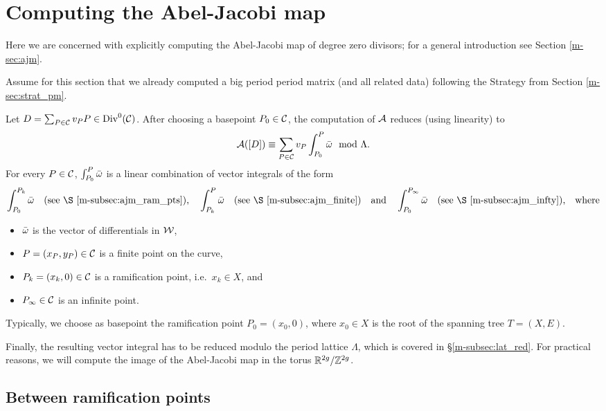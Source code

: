\documentclass[main.tex]{subfiles}
\begin{document}
  \section{Computing the Abel-Jacobi map}\label{sec:comp_ajm}
  
   Here we are concerned with explicitly computing the Abel-Jacobi map of degree zero divisors; for a general introduction see Section \ref{m-sec:ajm}.
   
   Assume for this section that we already computed a big period period matrix (and all related data) following the Strategy from Section \ref{m-sec:strat_pm}. 
   
   Let $D = \sum_{P \in \mathcal{C}} v_P P \in \operatorname{Div}^0(\mathcal{C})$. After choosing a basepoint $P_0 \in \mathcal{C}$, the computation of $\mathcal{A}$ reduces (using linearity) to
   \begin{equation*}
     \mathcal{A}([D]) \equiv \sum_{P \in \mathcal{C}} v_P \int_{P_0}^P \bar{\omega} \mod \Lambda.
   \end{equation*}
  For every $P \in \mathcal{C}$, $\int_{P_0}^P \bar{\omega}$ is a linear combination of vector integrals of the form
  \begin{align*}
    \int_{P_0}^{P_k} \bar\w\quad \text{(see \S \ref{m-subsec:ajm_ram_pts}),} \quad
    \int_{P_k}^{P} \bar\w \quad \text{(see \S \ref{m-subsec:ajm_finite})}
    \quad \text{and} \quad \int_{P_0}^{P_{\infty}} \bar\w\quad \text{(see \S \ref{m-subsec:ajm_infty}),} \quad \text{where}
  \end{align*}
  \begin{itemize}
   \item $\bar{\omega}$ is the vector of differentials in $\mathcal{W}$,
   \item $P = (x_P,y_P) \in \mathcal{C}$ is a finite point on the curve,
   \item $P_k = (x_k,0) \in \mathcal{C}$ is a ramification point, i.e.\ $x_k \in X$, and
   \item $P_{\infty} \in \mathcal{C}$ is an infinite point.
  \end{itemize}
  
   Typically, we choose as basepoint the ramification point $P_0 = (x_0,0)$, where $x_0 \in X$ is the root of the spanning tree $T = (X,E)$.
   
  Finally, the resulting vector integral has to be reduced modulo the period lattice $\Lambda$, which is covered in \S \ref{m-subsec:lat_red}. For practical reasons, we will compute the
  image of the Abel-Jacobi map in the torus $\mathbb{R}^{2g} / \mathbb{Z}^{2g}$.
  
  
  \subsection{Between ramification points}\label{subsec:ajm_ram_pts}
\end{document}
